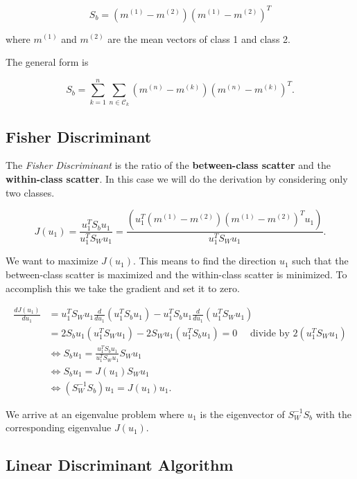 \[
	S_b = (m^{(1)} - m^{(2)})(m^{(1)} - m^{(2)})^T
\]

where \(m^{(1)}\) and \(m^{(2)}\) are the mean vectors of class 1 and class 2.

The general form is 

\[
	S_b = \sum_{k = 1}^{n} \sum_{n \in \mathcal{C}_k} (m^{(n)} - m^{(k)})(m^{(n)} - m^{(k)})^T.
\]

\subsection{Fisher Discriminant}

The \emph{Fisher Discriminant} is the ratio of the \textbf{between-class scatter} and the \textbf{within-class scatter}.
In this case we will do the derivation by considering only two classes.

\[
	J(u_1) = \frac{u_1^T S_b u_1}{u_1^T S_W u_1} = \frac{(u_1^T (m^{(1)} - m^{(2)})(m^{(1)} - m^{(2)})^T u_1)}{u_1^T S_W u_1}.
\]

We want to maximize \(J(u_1)\). This means to find the direction \(u_1\) such that the between-class scatter is maximized and the
within-class scatter is minimized. To accomplish this we take the gradient and set it to zero.

\begin{align*}
	\frac{d J(u_1)}{du_1} & = u_1^T S_W u_1 \frac{d}{du_1} (u_1^T S_b u_1) - u_1^T S_b u_1 \frac{d}{du_1} (u_1^T S_W u_1)          \\
	                      & = 2 S_b u_1 (u_1^T S_W u_1) - 2 S_W u_1 (u_1^T S_b u_1) = 0 \quad \text{ divide by } 2 (u_1^T S_W u_1) \\
	                      & \iff S_b u_1 = \frac{u_1^T S_b u_1}{u_1^T S_W u_1} S_W u_1                                             \\
	                      & \iff S_b u_1 = J(u_1) S_W u_1                                                                          \\
	                      & \iff (S_W^{-1} S_b) u_1 = J(u_1) u_1.
\end{align*}

We arrive at an eigenvalue problem where \(u_1\) is the eigenvector of \(S_W^{-1} S_b\) with the corresponding
eigenvalue \(J(u_1)\).

\subsection{Linear Discriminant Algorithm}

